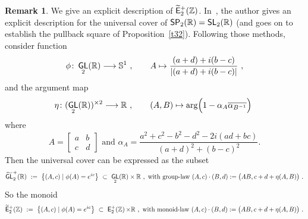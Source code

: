\documentclass{amsart}
\theoremstyle{definition}
\newtheorem{remark}[theorem]{Remark}
\theoremstyle{remark}
\newcommand{\w}{\widetilde}
\def\sE{\mathsf E}\def\sF{\mathsf F}\def\sG{\mathsf G}\def\sH{\mathsf H}
\DeclareMathOperator{\Ebraid}{\w{\sf E}_{2}^{+}(\ZZ)}
\DeclareMathOperator{\GL}{\sf GL}
\DeclareMathOperator{\SP}{\sf SP}
\DeclareMathOperator{\SL}{\sf SL}
\DeclareMathOperator{\EpZ}{\sE^+_2(\ZZ)}
\begin{document}
\begin{remark}
We give an explicit description of $\Ebraid$.
In~\cite{rawn}, the author gives an explicit description for the universal cover of $\SP_{2}(\RR) = \SL_{2}(\RR)$ (and goes on to establish the pullback square of Proposition~\ref{t32}).
Following those methods, consider function
\[
\phi
\colon
\GL_2(\RR)
\longrightarrow
\SS^1
~,\qquad
A \mapsto \frac{(a + d) + i(b - c)}{|(a + d) + i(b - c)|}
~,
\]
and the argument map
\[
\eta 
\colon
(\GL_{2}(\RR))^{\times 2} 
\longrightarrow 
\RR
~,\qquad
(A, B) \mapsto
\arg\Bigl(
1 - \alpha_{A}\overline{\alpha_{B^{-1}}}
\Bigr)
~
\]
where
\[
A =
\begin{bmatrix}
a & b 
\\
c & d
\end{bmatrix}
\text{ and }
\alpha_{A} = \frac{a^{2} + c^{2} - b^{2} - d^{2} - 2i(ad + bc)}{(a + d)^{2} + (b - c)^{2}}.
\]
Then the universal cover can be expressed as the subset 
\[
\w{\GL}^+_{2}(\RR)
~:=~
\bigl\{
(A, c)  \mid  \phi(A) = e^{ic}
\bigr\}
~\subset~
\GL_2(\RR)\times \RR
~,~
\text{with group-law }(A, c) \cdot (B, d) := \bigl(AB, c + d + \eta(A, B) \bigr)
~.
\]
So the monoid
\[
\Ebraid
~:=~
\bigl\{
(A, c)  \mid  \phi(A) = e^{ic}
\bigr\}
~\subset~
\EpZ \times \RR
~,~
\text{with monoid-law }(A, c) \cdot (B, d) := \bigl(AB, c + d + \eta(A, B) \bigr)
~.
\]
\end{remark}
\end{document}

